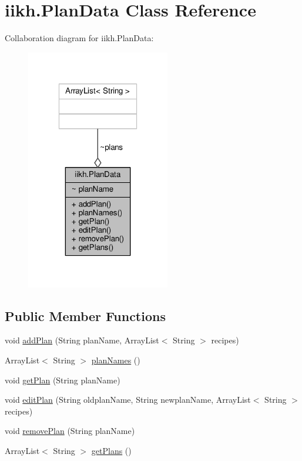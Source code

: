\hypertarget{classiikh_1_1PlanData}{\section{iikh.\-Plan\-Data Class Reference}
\label{classiikh_1_1PlanData}
}


Collaboration diagram for iikh.\-Plan\-Data\-:
\nopagebreak
\begin{figure}[H]
\begin{center}
\leavevmode
\includegraphics[width=178pt]{classiikh_1_1PlanData__coll__graph}
\end{center}
\end{figure}
\subsection*{Public Member Functions}
\begin{DoxyCompactItemize}
\item 
void \hyperlink{classiikh_1_1PlanData_a86e0a03aefaa8d01863abe280ccd67b2}{add\-Plan} (String plan\-Name, Array\-List$<$ String $>$ recipes)
\item 
Array\-List$<$ String $>$ \hyperlink{classiikh_1_1PlanData_a667ee00aa6c489febaea35301d623be8}{plan\-Names} ()
\item 
void \hyperlink{classiikh_1_1PlanData_a5b382a34fd5e7ea0f751cdf235ed7c58}{get\-Plan} (String plan\-Name)
\item 
void \hyperlink{classiikh_1_1PlanData_a3f6e92b4b5972aca919b10e27dd46ee1}{edit\-Plan} (String oldplan\-Name, String newplan\-Name, Array\-List$<$ String $>$ recipes)
\item 
void \hyperlink{classiikh_1_1PlanData_a3f2a629308fac33d893afff49131e931}{remove\-Plan} (String plan\-Name)
\item 
Array\-List$<$ String $>$ \hyperlink{classiikh_1_1PlanData_a979dec6192d46f34736fdd7eab84c532}{get\-Plans} ()
\end{DoxyCompactItemize}


